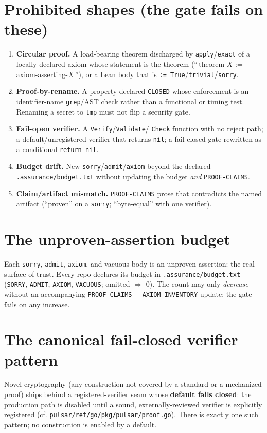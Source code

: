 \documentclass[11pt]{article}
\begin{document}
\section{Prohibited shapes (the gate fails on these)}
\begin{enumerate}[leftmargin=*]
  \item \textbf{Circular proof.} A load-bearing theorem discharged by
    \texttt{apply}/\texttt{exact} of a locally declared axiom whose statement
    is the theorem (``\,theorem $X$ := axiom-asserting-$X$\,''), or a Lean
    body that is \texttt{:= True}/\texttt{trivial}/\texttt{sorry}.
  \item \textbf{Proof-by-rename.} A property declared \texttt{CLOSED} whose
    enforcement is an identifier-name \texttt{grep}/AST check rather than a
    functional or timing test. Renaming a secret to \texttt{tmp} must not
    flip a security gate.
  \item \textbf{Fail-open verifier.} A \texttt{Verify}/\texttt{Validate}/
    \texttt{Check} function with no reject path; a default/unregistered
    verifier that returns \texttt{nil}; a fail-closed gate rewritten as a
    conditional \texttt{return nil}.
  \item \textbf{Budget drift.} New \texttt{sorry}/\texttt{admit}/\texttt{axiom}
    beyond the declared \texttt{.assurance/budget.txt} without updating the
    budget \emph{and} \texttt{PROOF-CLAIMS}.
  \item \textbf{Claim/artifact mismatch.} \texttt{PROOF-CLAIMS} prose that
    contradicts the named artifact (``proven'' on a \texttt{sorry};
    ``byte-equal'' with one verifier).
\end{enumerate}

\section{The unproven-assertion budget}\label{sec:budget}
Each \texttt{sorry}, \texttt{admit}, \texttt{axiom}, and vacuous body is an
unproven assertion: the real surface of trust. Every repo declares its budget
in \texttt{.assurance/budget.txt} (\texttt{SORRY}, \texttt{ADMIT},
\texttt{AXIOM}, \texttt{VACUOUS}; omitted $\Rightarrow$ $0$). The count may
only \emph{decrease} without an accompanying \texttt{PROOF-CLAIMS} +
\texttt{AXIOM-INVENTORY} update; the gate fails on any increase.

\section{The canonical fail-closed verifier pattern}
Novel cryptography (any construction not covered by a standard or a mechanized
proof) ships behind a registered-verifier seam whose \textbf{default fails
closed}: the production path is disabled until a sound, externally-reviewed
verifier is explicitly registered (cf. \texttt{pulsar/ref/go/pkg/pulsar/proof.go}).
There is exactly one such pattern; no construction is enabled by a default.
\end{document}
